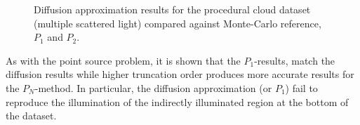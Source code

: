 \begin{figure}[h]
\caption{Diffusion approximation results for the procedural cloud dataset (multiple scattered light) compared against Monte-Carlo reference, $P_1$ and $P_2$.}
\label{fig:da_results_nebulae_1}
\end{figure}

As with the point source problem, it is shown that the $P_1$-results, match the diffusion results while higher truncation order produces more accurate results for the $P_N$-method. In particular, the diffusion approximation (or $P_1$) fail to reproduce the illumination of the indirectly illuminated region at the bottom of the dataset.
